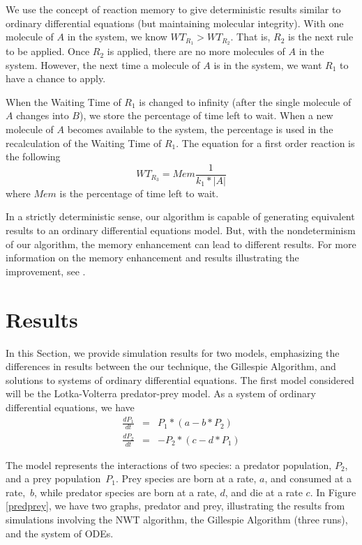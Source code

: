 \documentclass[copyright]{eptcs}
\newcommand{\noi}{\noindent}
\begin{document}
We use the concept of reaction memory to give deterministic results similar to ordinary 
differential equations (but maintaining molecular integrity).  With one molecule of $A$ 
in the system, we know \hbox{$WT_{R_1}>WT_{R_2}$}.  That is, $R_2$ is the next rule to be 
applied.  Once $R_2$ is applied, there are no more molecules of $A$ in the system.  
However, the next time a molecule of $A$ is in the system, we want $R_1$ to have a chance 
to apply.

When the Waiting Time of $R_1$ is changed to infinity (after the single molecule of $A$ changes into $B$), we store the percentage of time left to wait.  When a new molecule of $A$ becomes available to the system, the percentage is used in the recalculation of the Waiting Time of $R_1$.  The equation for a first order reaction is the following
\begin{equation}
WT_{R_3}=\mathit{Mem}\frac{1}{k_1*|A|}
\label{wtmem}
\end{equation}
\noi where $\mathit{Mem}$ is the percentage of time left to wait.


In a strictly deterministic sense, our algorithm is capable of generating equivalent results to an ordinary differential equations model.  But, with the nondeterminism of our algorithm, the memory enhancement can lead to different results.  For more information on the memory enhancement and results illustrating the improvement, see \cite{jack09}.

\section{Results}\label{results}

In this Section, we provide simulation results for two models, emphasizing the differences 
in results between the our technique, the Gillespie Algorithm, and solutions to systems of
ordinary differential equations.  The first model considered will be the Lotka-Volterra 
predator-prey model.  As a system of ordinary differential equations, we have
\begin{eqnarray}
\frac{dP_1}{dt}&=&P_1*(a-b*P_2)\nonumber\\      \frac{dP_2}{dt}&=&-P_2*(c-d*P_1)        \label{lotkaeqs}
\end{eqnarray}

The model represents the interactions of two species: a predator population, $P_2$, and a 
prey population~$P_1$.  Prey species are born at a rate, $a$, and consumed at a rate,~$b$, 
while predator species are born at a rate, $d$, and die at a rate $c$.  
In Figure \ref{predprey}, we have two graphs, predator and prey, illustrating the results 
from simulations involving the NWT algorithm, the Gillespie Algorithm (three runs), and the 
system of ODEs.
\end{document}
